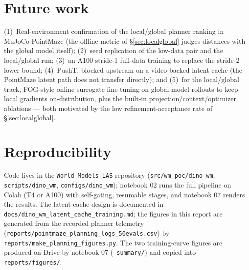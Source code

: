 \documentclass[11pt,a4paper]{article}
\begin{document}
\section{Future work}
\label{sec:future}

(1)~Real-environment confirmation of the local/global planner ranking in MuJoCo
PointMaze (the offline metric of \S\ref{sec:localglobal} judges distances with
the global model itself); (2)~seed replication of the low-data pair and the
local/global run; (3)~an A100
stride-1 full-data training to replace the stride-2 lower bound;
(4)~PushT, blocked upstream on a video-backed latent cache (the PointMaze
latent path does not transfer directly); and (5)~for the local/global track,
FOG-style online surrogate fine-tuning on global-model rollouts to keep local
gradients on-distribution, plus the built-in projection/context/optimizer
ablations --- both motivated by the low refinement-acceptance rate of
\S\ref{sec:localglobal}.

\section*{Reproducibility}

Code lives in the \texttt{World\_Models\_LAS} repository
(\texttt{src/wm\_poc/dino\_wm}, \texttt{scripts/dino\_wm},
\texttt{configs/dino\_wm}); notebook 02 runs the full pipeline on Colab
(T4 or A100) with self-gating, resumable stages, and notebook 07 renders the
results. The latent-cache design is documented in
\texttt{docs/dino\_wm\_latent\_cache\_training.md}; the figures in this report
are generated from the recorded planner telemetry
(\texttt{reports/pointmaze\_planning\_logs\_50evals.csv}) by
\texttt{reports/make\_planning\_figures.py}. The two training-curve figures are
produced on Drive by notebook 07 (\texttt{\_summary/}) and copied into
\texttt{reports/figures/}.
\end{document}

